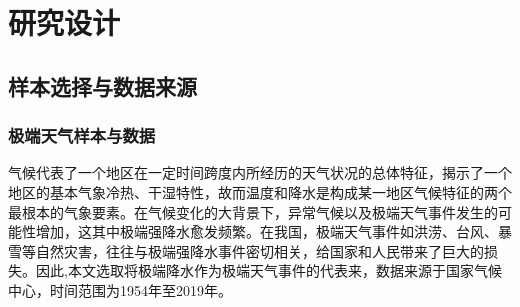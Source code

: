 \chapter{研究设计}\label{chap:3}
\section{样本选择与数据来源}
\subsection{极端天气样本与数据}\label{sec:def}

气候代表了一个地区在一定时间跨度内所经历的天气状况的总体特征，揭示了一个地区的基本气象冷热、干湿特性，故而温度和降水是构成某一地区气候特征的两个最根本的气象要素\citep{alexander2006global}。在气候变化的大背景下，异常气候以及极端天气事件发生的可能性增加\citep{aigner2023summary,donat2017addendum}，这其中极端强降水愈发频繁\citep{trenberth2010relationships}。在我国，极端天气事件如洪涝、台风、暴雪等自然灾害\citep{尹红2019基于}，往往与极端强降水事件密切相关，给国家和人民带来了巨大的损失。因此,本文选取将极端降水作为极端天气事件的代表来，数据来源于国家气候中心，时间范围为1954年至2019年。


